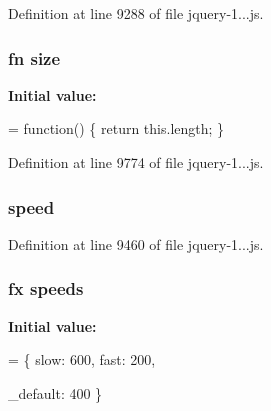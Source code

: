 Definition at line 9288 of file jquery-\/1...\+js.

\subsubsection[{\texorpdfstring{size}{size}}]{ {\bf fn} size}\hypertarget{_scripts_2jquery-1_810_82_8js_afa6806c6ee5e63d5177f1dcc082ba6bc}{}\label{_scripts_2jquery-1_810_82_8js_afa6806c6ee5e63d5177f1dcc082ba6bc}
{\bfseries Initial value\+:}
\begin{DoxyCode}
= \textcolor{keyword}{function}() \{
    \textcolor{keywordflow}{return} this.length;
\}
\end{DoxyCode}


Definition at line 9774 of file jquery-\/1...\+js.

\subsubsection[{\texorpdfstring{speed}{speed}}]{ speed}\hypertarget{_scripts_2jquery-1_810_82_8js_add98c90065e6563cba26ff6d2016c46c}{}\label{_scripts_2jquery-1_810_82_8js_add98c90065e6563cba26ff6d2016c46c}


Definition at line 9460 of file jquery-\/1...\+js.

\subsubsection[{\texorpdfstring{speeds}{speeds}}]{ {\bf fx} speeds}\hypertarget{_scripts_2jquery-1_810_82_8js_a1079544ab08b6d4ca1692ce090f6ea2d}{}\label{_scripts_2jquery-1_810_82_8js_a1079544ab08b6d4ca1692ce090f6ea2d}
{\bfseries Initial value\+:}
\begin{DoxyCode}
= \{
    slow: 600,
    fast: 200,
    
    \_default: 400
\}
\end{DoxyCode}


